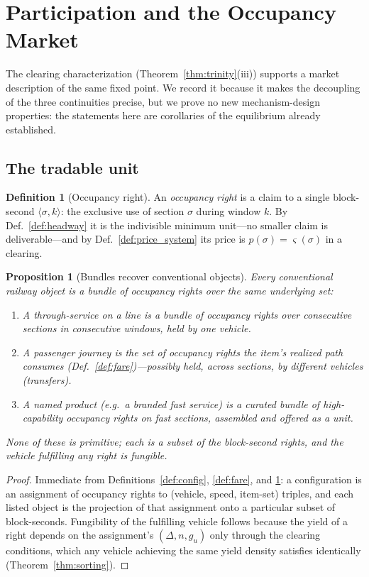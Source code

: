 \documentclass[11pt,twocolumn,a4paper]{article}
\newtheorem{proposition}[theorem]{Proposition}
\theoremstyle{definition}
\newtheorem{definition}[theorem]{Definition}
\theoremstyle{remark}
\newcommand{\sep}{\varsigma}
\begin{document}
\section{Participation and the Occupancy Market}
\label{sec:market}

The clearing characterization (Theorem~\ref{thm:trinity}(iii)) supports a market description of the same fixed point. We record it because it makes the decoupling of the three continuities precise, but we prove no new mechanism-design properties: the statements here are corollaries of the equilibrium already established.

\subsection{The tradable unit}

\begin{definition}[Occupancy right]
\label{def:right}
An \emph{occupancy right} is a claim to a single block-second $\langle\sigma,k\rangle$: the exclusive use of section $\sigma$ during window $k$. By Def.~\ref{def:headway} it is the indivisible minimum unit---no smaller claim is deliverable---and by Def.~\ref{def:price_system} its price is $p(\sigma)=\sep(\sigma)$ in a clearing.
\end{definition}

\begin{proposition}[Bundles recover conventional objects]
\label{prop:bundles}
Every conventional railway object is a bundle of occupancy rights over the same underlying set:
\begin{enumerate}[nosep]
\item A \emph{through-service} on a line is a bundle of occupancy rights over consecutive sections in consecutive windows, held by one vehicle.
\item A \emph{passenger journey} is the set of occupancy rights the item's realized path consumes (Def.~\ref{def:fare})---possibly held, across sections, by different vehicles (transfers).
\item A named \emph{product} (e.g.\ a branded fast service) is a curated bundle of high-capability occupancy rights on fast sections, assembled and offered as a unit.
\end{enumerate}
None of these is primitive; each is a subset of the block-second rights, and the vehicle fulfilling any right is fungible.
\end{proposition}

\begin{proof}
Immediate from Definitions~\ref{def:config}, \ref{def:fare}, and \ref{def:right}: a configuration is an assignment of occupancy rights to (vehicle, speed, item-set) triples, and each listed object is the projection of that assignment onto a particular subset of block-seconds. Fungibility of the fulfilling vehicle follows because the yield of a right depends on the assignment's $(\Delta, n, g_u)$ only through the clearing conditions, which any vehicle achieving the same yield density satisfies identically (Theorem~\ref{thm:sorting}).
\end{proof}
\end{document}
